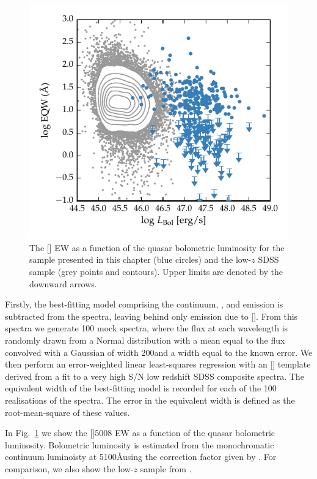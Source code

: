 \begin{figure}
    \includegraphics[width=\columnwidth]{figures/chapter04/eqw_lum.pdf} 
    \caption{The [] EW as a function of the quasar bolometric luminosity for the sample presented in this chapter (blue circles) and the low-$z$ SDSS sample (grey points and contours). Upper limits are denoted by the downward arrows.}     
    \label{fig:eqw_lum}
\end{figure}

Firstly, the best-fitting model comprising the continuum, , and \hb emission is subtracted from the spectra, leaving behind only emission due to []. 
From this spectra we generate 100 mock spectra, where the flux at each wavelength is randomly drawn from a Normal distribution with a mean equal to the flux convolved with a Gaussian of width 200\kms and a width equal to the known error. 
We then perform an error-weighted linear least-squares regression with an [] template derived from a fit to a very high S/N low redshift SDSS composite spectra. 
The equivalent width of the best-fitting model is recorded for each of the 100 realisations of the spectra. 
The error in the equivalent width is defined as the root-mean-square of these values.

In Fig.~\ref{fig:eqw_lum} we show the []5008 EW as a function of the quasar bolometric luminosity. 
Bolometric luminosity is estimated from the monochromatic continuum luminoisty at 5100\AA using the correction factor given by \citet{richards06}. 
For comparison, we also show the low-$z$ sample from \citet{shen11}.  


